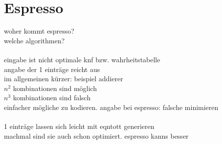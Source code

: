\section{Espresso}
\label{sec:espresso}


woher kommt espresso?\\
welche algorithmen?\\
~\\
eingabe ist nicht optimale knf bzw. wahrheitstabelle\\
angabe der 1 einträge reicht aus\\
im allgemeinen kürzer: beispiel addierer\\
$ n^2 $ kombinationen sind möglich\\
$ n^3 $ kombinationen sind falsch\\
einfacher mögliche zu kodieren. angabe bei espresso: falsche minimieren\\
~\\
1 einträge lassen sich leicht mit eqntott generieren\\
machmal sind sie auch schon optimiert. espresso kanns besser